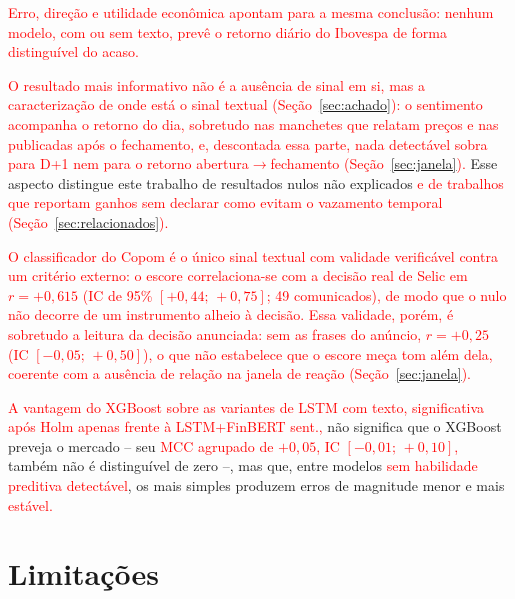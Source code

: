 \documentclass[conference]{IEEEtran}
\newcommand{\novo}[1]{\textcolor{red}{#1}}
\begin{document}
\novo{Erro, dire\c{c}\~ao e utilidade econ\^omica apontam para a mesma conclus\~ao: nenhum modelo, com ou sem texto, prev\^e o retorno di\'ario do Ibovespa de forma distingu\'ivel do acaso.}

\novo{O resultado mais informativo n\~ao \'e a aus\^encia de sinal em si, mas a caracteriza\c{c}\~ao de onde est\'a o sinal textual (Se\c{c}\~ao~\ref{sec:achado}): o sentimento acompanha o retorno do dia, sobretudo nas manchetes que relatam pre\c{c}os e nas publicadas ap\'os o fechamento, e, descontada essa parte, nada detect\'avel sobra para D+1 nem para o retorno abertura$\to$fechamento (Se\c{c}\~ao~\ref{sec:janela}).} Esse aspecto distingue este trabalho de resultados nulos n\~ao explicados \novo{e de trabalhos que reportam ganhos sem declarar como evitam o vazamento temporal (Se\c{c}\~ao~\ref{sec:relacionados}).}

\novo{O classificador do Copom \'e o \'unico sinal textual com validade verific\'avel contra um crit\'erio externo: o escore correlaciona-se com a decis\~ao real de Selic em $r=+0{,}615$ (IC de 95\% $[+0{,}44;\,+0{,}75]$; 49 comunicados), de modo que o nulo n\~ao decorre de um instrumento alheio \`a decis\~ao. Essa validade, por\'em, \'e sobretudo a leitura da decis\~ao anunciada: sem as frases do an\'uncio, $r=+0{,}25$ (IC $[-0{,}05;\,+0{,}50]$), o que n\~ao estabelece que o escore me\c{c}a tom al\'em dela, coerente com a aus\^encia de rela\c{c}\~ao na janela de rea\c{c}\~ao (Se\c{c}\~ao~\ref{sec:janela}).}

\novo{A vantagem do XGBoost sobre as variantes de LSTM com texto, significativa ap\'os Holm apenas frente \`a LSTM+FinBERT sent.,} n\~ao significa que o XGBoost preveja o mercado -- seu \novo{MCC agrupado de $+0{,}05$, IC $[-0{,}01;\,+0{,}10]$,} tamb\'em n\~ao \'e distingu\'ivel de zero --, mas que, entre modelos \novo{sem habilidade preditiva detect\'avel}, os mais simples produzem erros de magnitude menor e mais \novo{est\'avel.}

\section{Limita\c{c}\~oes}
\label{sec:limitacoes}
\end{document}
